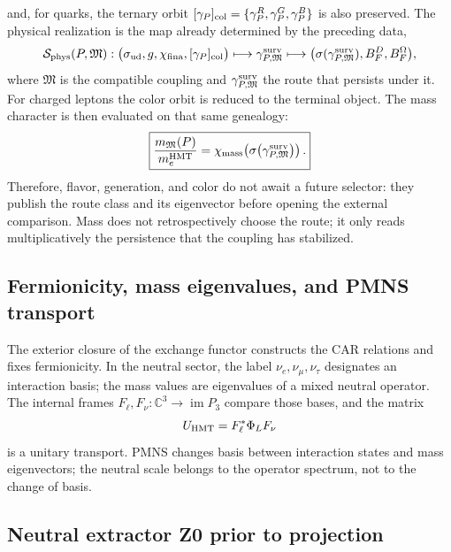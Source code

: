 and, for quarks, the ternary orbit
\([\gamma_P]_{\rm col}=\{\gamma_P^R,\gamma_P^G,\gamma_P^B\}\) is also preserved. The physical
realization is the map already determined by the preceding data,
\begin{equation}
 \mathcal S_{\rm phys}(P,\mathfrak M):
 \bigl(\sigma_{\rm ud},g,\chi_{\rm fina},[\gamma_P]_{\rm col}\bigr)
 \longmapsto \gamma^{\rm surv}_{P,\mathfrak M}
 \longmapsto
 \bigl(\sigma(\gamma^{\rm surv}_{P,\mathfrak M}),
       B_F^D,B_F^\Omega\bigr),
 \label{eq:realizacion-fisica-sabor-ruta-cerrada-rev2}
\end{equation}
where \(\mathfrak M\) is the compatible coupling and
\(\gamma^{\rm surv}_{P,\mathfrak M}\) the route that persists under it. For
charged leptons the color orbit is reduced to the terminal object. The mass
character is then evaluated on that same genealogy:
\begin{equation}
 \boxed{
 \frac{m_{\mathfrak M}(P)}{m_e^{\rm HMT}}
 =\chi_{\rm mass}\!\left(
   \sigma\!\left(\gamma^{\rm surv}_{P,\mathfrak M}\right)\right).}
 \label{eq:masa-como-caracter-persistencia-rev2}
\end{equation}
Therefore, flavor, generation, and color do not await a future selector: they publish the
route class and its eigenvector before opening the external comparison. Mass does not
retrospectively choose the route; it only reads multiplicatively the persistence
that the coupling has stabilized.

\subsection{Fermionicity, mass eigenvalues, and PMNS transport}

The exterior closure of the exchange functor constructs the CAR relations
and fixes fermionicity. In the neutral sector, the label
\(\nu_e,\nu_\mu,\nu_\tau\) designates an interaction basis; the mass
values are eigenvalues of a mixed neutral operator. The internal frames
\(F_\ell,F_\nu:\mathbb C^3\to\operatorname{im}P_3\) compare those bases, and
the matrix
\begin{equation}
 U_{\rm HMT}=F_\ell^*\Phi_LF_\nu
 \label{eq:transporte-pmns-generaciones-rev2}
\end{equation}
is a unitary transport. PMNS changes basis between interaction states
and mass eigenvectors; the neutral scale belongs to the operator spectrum,
not to the change of basis.

\subsection{Neutral extractor Z0 prior to projection}
\label{sec:extractor-neutro-z0-torsion-rev2}

